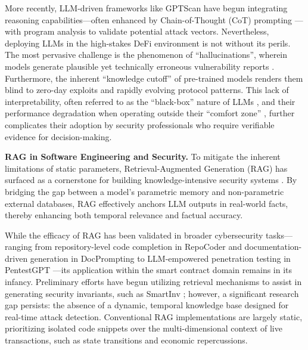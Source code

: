 More recently, LLM-driven frameworks like GPTScan \cite{GPTScan} have begun integrating reasoning capabilities—often enhanced by Chain-of-Thought (CoT) prompting \cite{wei2023chainofthoughtpromptingelicitsreasoning}—with program analysis to validate potential attack vectors. Nevertheless, deploying LLMs in the high-stakes DeFi environment is not without its perils. The most pervasive challenge is the phenomenon of ``hallucinations'', wherein models generate plausible yet technically erroneous vulnerability reports \cite{10.1145/3442188.3445922}. Furthermore, the inherent ``knowledge cutoff'' of pre-trained models renders them blind to zero-day exploits and rapidly evolving protocol patterns. This lack of interpretability, often referred to as the ``black-box'' nature of LLMs \cite{khare2024understandingeffectivenesslargelanguage}, and their performance degradation when operating outside their ``comfort zone'' \cite{guo2024outsidecomfortzoneanalysing}, further complicates their adoption by security professionals who require verifiable evidence for decision-making.

\noindent
\textbf{RAG in Software Engineering and Security.}
To mitigate the inherent limitations of static parameters, Retrieval-Augmented Generation (RAG) has surfaced as a cornerstone for building knowledge-intensive security systems \cite{lewis2021retrievalaugmentedgenerationknowledgeintensivenlp}. By bridging the gap between a model's parametric memory and non-parametric external databases, RAG effectively anchors LLM outputs in real-world facts, thereby enhancing both temporal relevance and factual accuracy.

While the efficacy of RAG has been validated in broader cybersecurity tasks—ranging from repository-level code completion in RepoCoder \cite{zhang2023repocoder} and documentation-driven generation in DocPrompting \cite{zhou2023docpromptinggeneratingcoderetrieving} to LLM-empowered penetration testing in PentestGPT \cite{deng2024pentestgptllmempoweredautomaticpenetration}—its application within the smart contract domain remains in its infancy. Preliminary efforts have begun utilizing retrieval mechanisms to assist in generating security invariants, such as SmartInv \cite{wang2024smartinvmultimodallearningsmart}; however, a significant research gap persists: the absence of a dynamic, temporal knowledge base designed for real-time attack detection. Conventional RAG implementations are largely static, prioritizing isolated code snippets over the multi-dimensional context of live transactions, such as state transitions and economic repercussions.


